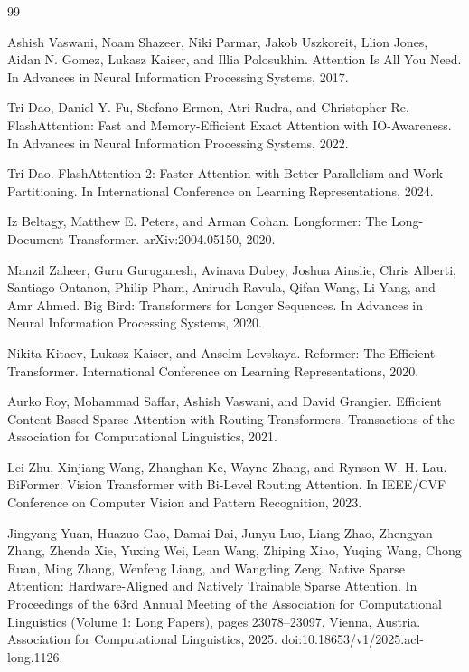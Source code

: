 \documentclass{article}
\begin{document}
\begin{thebibliography}{99}

Ashish Vaswani, Noam Shazeer, Niki Parmar, Jakob Uszkoreit, Llion Jones, Aidan N. Gomez, Lukasz Kaiser, and Illia Polosukhin.
Attention Is All You Need.
In Advances in Neural Information Processing Systems, 2017.

Tri Dao, Daniel Y. Fu, Stefano Ermon, Atri Rudra, and Christopher Re.
FlashAttention: Fast and Memory-Efficient Exact Attention with IO-Awareness.
In Advances in Neural Information Processing Systems, 2022.

Tri Dao.
FlashAttention-2: Faster Attention with Better Parallelism and Work Partitioning.
In International Conference on Learning Representations, 2024.

Iz Beltagy, Matthew E. Peters, and Arman Cohan.
Longformer: The Long-Document Transformer.
arXiv:2004.05150, 2020.

Manzil Zaheer, Guru Guruganesh, Avinava Dubey, Joshua Ainslie, Chris Alberti, Santiago Ontanon, Philip Pham, Anirudh Ravula, Qifan Wang, Li Yang, and Amr Ahmed.
Big Bird: Transformers for Longer Sequences.
In Advances in Neural Information Processing Systems, 2020.

Nikita Kitaev, Lukasz Kaiser, and Anselm Levskaya.
Reformer: The Efficient Transformer.
International Conference on Learning Representations, 2020.

Aurko Roy, Mohammad Saffar, Ashish Vaswani, and David Grangier.
Efficient Content-Based Sparse Attention with Routing Transformers.
Transactions of the Association for Computational Linguistics, 2021.

Lei Zhu, Xinjiang Wang, Zhanghan Ke, Wayne Zhang, and Rynson W. H. Lau.
BiFormer: Vision Transformer with Bi-Level Routing Attention.
In IEEE/CVF Conference on Computer Vision and Pattern Recognition, 2023.

Jingyang Yuan, Huazuo Gao, Damai Dai, Junyu Luo, Liang Zhao, Zhengyan Zhang, Zhenda Xie, Yuxing Wei, Lean Wang, Zhiping Xiao, Yuqing Wang, Chong Ruan, Ming Zhang, Wenfeng Liang, and Wangding Zeng.
Native Sparse Attention: Hardware-Aligned and Natively Trainable Sparse Attention.
In Proceedings of the 63rd Annual Meeting of the Association for Computational Linguistics (Volume 1: Long Papers), pages 23078--23097, Vienna, Austria. Association for Computational Linguistics, 2025. doi:10.18653/v1/2025.acl-long.1126.


\end{thebibliography}
\end{document}
